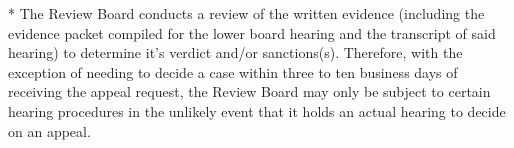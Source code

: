 * The Review Board conducts a review of the written evidence (including the evidence packet compiled for the lower board hearing and the transcript of said hearing) to determine it's verdict and/or sanctions(s). Therefore, with the exception of needing to decide a case within three to ten business days of receiving the appeal request, the Review Board may only be subject to certain hearing procedures in the unlikely event that it holds an actual hearing to decide on an appeal.